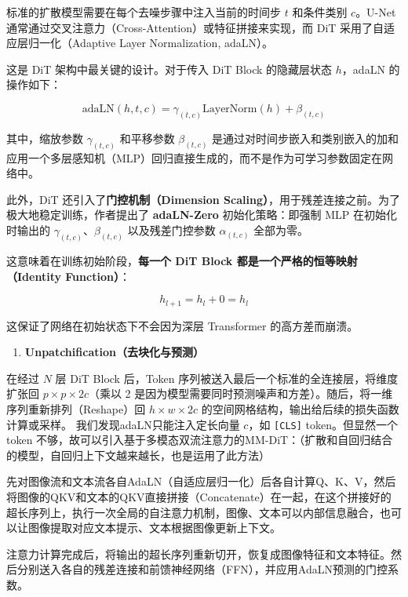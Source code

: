 标准的扩散模型需要在每个去噪步骤中注入当前的时间步 \(t\) 和条件类别 \(c\)。U-Net 通常通过交叉注意力（Cross-Attention）或特征拼接来实现，而 DiT 采用了自适应层归一化（Adaptive Layer Normalization, adaLN）。

这是 DiT 架构中最关键的设计。对于传入 DiT Block 的隐藏层状态 \(h\)，adaLN 的操作如下：

\[
\mathrm{adaLN}(h,t,c)=\gamma_{(t,c)}\mathrm{LayerNorm}(h)+\beta_{(t,c)}
\]

其中，缩放参数 \(\gamma_{(t,c)}\) 和平移参数 \(\beta_{(t,c)}\) 是通过对时间步嵌入和类别嵌入的加和应用一个多层感知机（MLP）回归直接生成的，而不是作为可学习参数固定在网络中。

此外，DiT 还引入了\textbf{门控机制（Dimension Scaling）}，用于残差连接之前。为了极大地稳定训练，作者提出了 \textbf{adaLN-Zero} 初始化策略：即强制 MLP 在初始化时输出的 \(\gamma_{(t,c)}\)、\(\beta_{(t,c)}\) 以及残差门控参数 \(\alpha_{(t,c)}\) 全部为零。

这意味着在训练初始阶段，\textbf{每一个 DiT Block 都是一个严格的恒等映射（Identity Function）}：

\[
h_{l+1}=h_l+0=h_l
\]

这保证了网络在初始状态下不会因为深层 Transformer 的高方差而崩溃。

\begin{enumerate}
\def\labelenumi{\arabic{enumi}.}
\setcounter{enumi}{2}
\tightlist
\item
  \textbf{Unpatchification（去块化与预测）}
\end{enumerate}

在经过 \(N\) 层 DiT Block 后，Token 序列被送入最后一个标准的全连接层，将维度扩张回 \(p\times p\times 2c\)（乘以 2 是因为模型需要同时预测噪声和方差）。随后，将一维序列重新排列（Reshape）回 \(h\times w\times 2c\) 的空间网格结构，输出给后续的损失函数计算或采样。
我们发现adaLN只能注入定长向量 \(c\)，如 \texttt{{[}CLS{]}} token。但显然一个 token 不够，故可以引入基于多模态双流注意力的MM-DiT：（扩散和自回归结合的模型，自回归上下文越来越长，也是运用了此方法）

先对图像流和文本流各自AdaLN（自适应层归一化）后各自计算Q、K、V，然后将图像的QKV和文本的QKV直接拼接（Concatenate）在一起，在这个拼接好的超长序列上，执行一次全局的自注意力机制，图像、文本可以内部信息融合，也可以让图像提取对应文本提示、文本根据图像更新上下文。

注意力计算完成后，将输出的超长序列重新切开，恢复成图像特征和文本特征。然后分别送入各自的残差连接和前馈神经网络（FFN），并应用AdaLN预测的门控系数。

